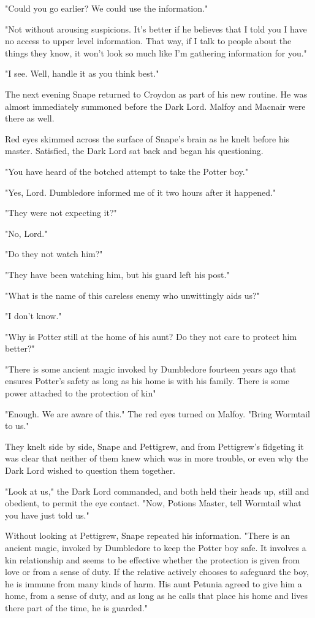 "Could you go earlier? We could use the information."

"Not without arousing suspicions. It's better if he believes that I told you I have no access to upper level information. That way, if I talk to people about the things they know, it won't look so much like I'm gathering information for you."

"I see. Well, handle it as you think best."

The next evening Snape returned to Croydon as part of his new routine. He was almost immediately summoned before the Dark Lord. Malfoy and Macnair were there as well.

Red eyes skimmed across the surface of Snape's brain as he knelt before his master. Satisfied, the Dark Lord sat back and began his questioning.

"You have heard of the botched attempt to take the Potter boy."

"Yes, Lord. Dumbledore informed me of it two hours after it happened."

"They were not expecting it?"

"No, Lord."

"Do they not watch him?"

"They have been watching him, but his guard left his post."

"What is the name of this careless enemy who unwittingly aids us?"

"I don't know."

"Why is Potter still at the home of his aunt? Do they not care to protect him better?"

"There is some ancient magic invoked by Dumbledore fourteen years ago that ensures Potter's safety as long as his home is with his family. There is some power attached to the protection of kin{\el}"

"Enough. We are aware of this." The red eyes turned on Malfoy. "Bring Wormtail to us."

They knelt side by side, Snape and Pettigrew, and from Pettigrew's fidgeting it was clear that neither of them knew which was in more trouble, or even why the Dark Lord wished to question them together.

"Look at us," the Dark Lord commanded, and both held their heads up, still and obedient, to permit the eye contact. "Now, Potions Master, tell Wormtail what you have just told us."

Without looking at Pettigrew, Snape repeated his information. "There is an ancient magic, invoked by Dumbledore to keep the Potter boy safe. It involves a kin relationship and seems to be effective whether the protection is given from love or from a sense of duty. If the relative actively chooses to safeguard the boy, he is immune from many kinds of harm. His aunt Petunia agreed to give him a home, from a sense of duty, and as long as he calls that place his home and lives there part of the time, he is guarded."

